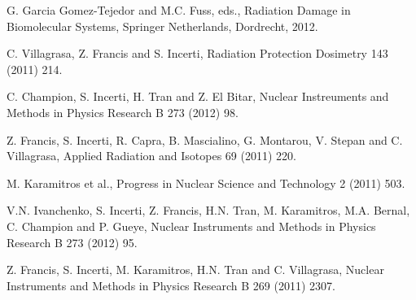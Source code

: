  G. Garcia Gomez-Tejedor and M.C. Fuss, eds., 
                         Radiation Damage in Biomolecular Systems, Springer Netherlands, 
                         Dordrecht, 2012.

 C. Villagrasa, Z. Francis and S. Incerti, 
                         Radiation Protection Dosimetry 143 (2011) 214.

 C. Champion, S. Incerti, H. Tran and Z. El Bitar, 
                         Nuclear Instreuments and Methods in Physics Research B 273 (2012) 98.

 Z. Francis, S. Incerti, R. Capra, B. Mascialino, 
                      G. Montarou, V. Stepan and C. Villagrasa,
                      Applied Radiation and Isotopes 69 (2011) 220.

 M. Karamitros et al.,
                            Progress in Nuclear Science and Technology 2 (2011) 503.



 V.N. Ivanchenko, S. Incerti, Z. Francis, H.N. Tran, 
                            M. Karamitros, M.A. Bernal, C. Champion and P. Gueye, 
                            Nuclear Instruments and Methods in Physics Research B 273 (2012) 95.

 Z. Francis, S. Incerti, M. Karamitros, H.N. Tran and C. Villagrasa,
                        Nuclear Instruments and Methods in Physics Research B 269 (2011) 2307.

